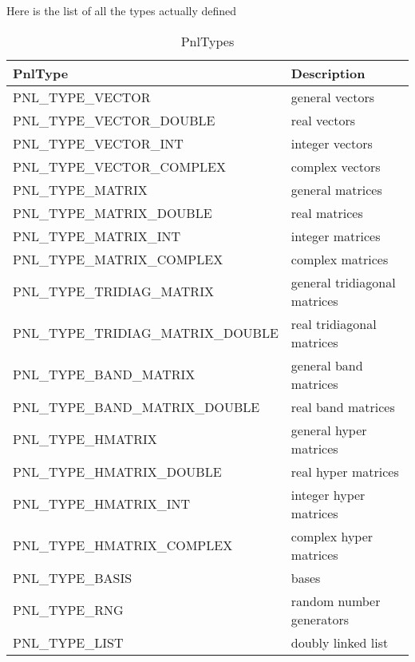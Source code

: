Here is the list of all the types actually defined
\begin{table}
  \centering
  \begin{tabular}{l|l}
    \hline
    PnlType & Description \\
    \hline
    PNL_TYPE_VECTOR & general vectors  \\
    PNL_TYPE_VECTOR_DOUBLE & real vectors \\
    PNL_TYPE_VECTOR_INT & integer vectors \\
    PNL_TYPE_VECTOR_COMPLEX & complex vectors \\
    PNL_TYPE_MATRIX & general matrices  \\
    PNL_TYPE_MATRIX_DOUBLE & real matrices \\
    PNL_TYPE_MATRIX_INT & integer matrices \\
    PNL_TYPE_MATRIX_COMPLEX & complex matrices \\
    PNL_TYPE_TRIDIAG_MATRIX & general tridiagonal matrices \\
    PNL_TYPE_TRIDIAG_MATRIX_DOUBLE & real  tridiagonal matrices \\
    PNL_TYPE_BAND_MATRIX & general band matrices \\
    PNL_TYPE_BAND_MATRIX_DOUBLE & real band matrices \\
    PNL_TYPE_HMATRIX & general hyper matrices \\
    PNL_TYPE_HMATRIX_DOUBLE & real hyper matrices \\
    PNL_TYPE_HMATRIX_INT & integer hyper matrices \\
    PNL_TYPE_HMATRIX_COMPLEX & complex hyper matrices \\
    PNL_TYPE_BASIS & bases \\
    PNL_TYPE_RNG & random number generators \\
    PNL_TYPE_LIST & doubly linked list
  \end{tabular}
  \caption{PnlTypes}
  \label{types}
\end{table}

